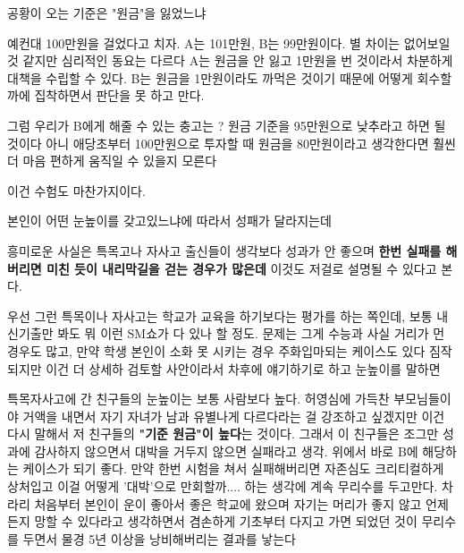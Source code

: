 \vspace{5mm}

공황이 오는 기준은 "원금"을 잃었느냐
\vspace{5mm}

예컨대 100만원을 걸었다고 치자.
A는 101만원, B는 99만원이다. 별 차이는 없어보일 것 같지만 심리적인 동요는 다르다
A는 원금을 안 잃고 1만원을 번 것이라서 차분하게 대책을 수립할 수 있다.
B는 원금을 1만원이라도 까먹은 것이기 때문에 어떻게 회수할까에 집착하면서 판단을 못 하고 만다.
\vspace{5mm}

그럼 우리가 B에게 해줄 수 있는 충고는 ?
원금 기준을 95만원으로 낮추라고 하면 될 것이다
아니 애당초부터 100만원으로 투자할 때 원금을 80만원이라고 생각한다면
훨씬 더 마음 편하게 움직일 수 있을지 모른다
\vspace{5mm}

이건 수험도 마찬가지이다.
\vspace{5mm}

본인이 어떤 눈높이를 갖고있느냐에 따라서 성패가 달라지는데
\vspace{5mm}

흥미로운 사실은 특목고나 자사고 출신들이 생각보다 성과가 안 좋으며
\textbf{한번 실패를 해버리면 미친 듯이 내리막길을 걷는 경우가 많은데} 이것도 저걸로 설명될 수 있다고 본다.
\vspace{5mm}

우선 그런 특목이나 자사고는 학교가 교육을 하기보다는 평가를 하는 쪽인데, 보통 내신기출만 봐도 뭐 이런 SM쇼가 다 있나 할 정도.
문제는 그게 수능과 사실 거리가 먼 경우도 많고, 만약 학생 본인이 소화 못 시키는 경우 주화입마되는 케이스도 있다 짐작되지만
이건 더 상세하 검토할 사안이라서 차후에 얘기하기로 하고 눈높이를 말하면
\vspace{5mm}

특목자사고에 간 친구들의 눈높이는 보통 사람보다 높다.
허영심에 가득찬 부모님들이야 거액을 내면서 자기 자녀가 남과 유별나게 다르다라는 걸 강조하고 싶겠지만
이건 다시 말해서 저 친구들의 \textbf{"기준 원금"이 높다}는 것이다.
그래서 이 친구들은 조그만 성과에 감사하지 않으면서 대박을 거두지 않으면 실패라고 생각.
위에서 바로 B에 해당하는 케이스가 되기 좋다.
만약 한번 시험을 쳐서 실패해버리면 자존심도 크리티컬하게 상처입고
이걸 어떻게 '대박'으로 만회할까.... 하는 생각에  계속 무리수를 두고만다.
차라리 처음부터 본인이 운이 좋아서 좋은 학교에 왔으며 자기는 머리가 좋지 않고 언제든지 망할 수 있다라고 생각하면서
겸손하게 기초부터 다지고 가면 되었던 것이 무리수를 두면서 물경 5년 이상을 낭비해버리는 결과를 낳는다
\vspace{5mm}

